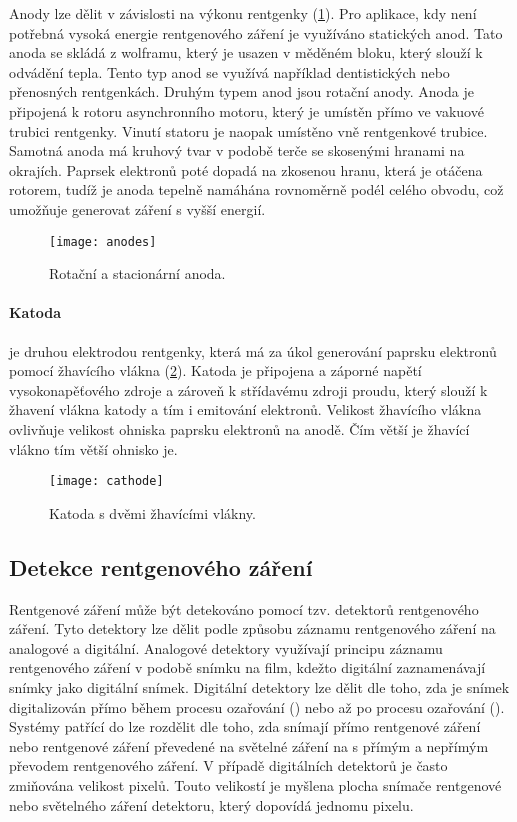 Anody lze dělit v závislosti na výkonu rentgenky (\cref{fig:anodes}). Pro aplikace, kdy není potřebná vysoká energie rentgenového záření je využíváno statických anod. Tato anoda se skládá z wolframu, který je usazen v měděném bloku, který slouží k odvádění tepla. Tento typ anod se využívá například dentistických nebo přenosných rentgenkách. Druhým typem anod jsou rotační anody. Anoda je připojená k rotoru asynchronního motoru, který je umístěn přímo ve vakuové trubici rentgenky. Vinutí statoru je naopak umístěno vně rentgenkové trubice. Samotná anoda má kruhový tvar v podobě terče se skosenými hranami na okrajích. Paprsek elektronů poté dopadá na zkosenou hranu, která je otáčena rotorem, tudíž je anoda tepelně namáhána rovnoměrně podél celého obvodu, což umožňuje generovat záření s vyšší energií. \cite[str.~98]{Diagnostic-Radiology-Physics}

\begin{figure}[hb]
\centering
\texttt{[image: anodes]}
\caption{Rotační a stacionární anoda. \cite{the-xray-beam}}
\label{fig:anodes}
\end{figure}


\paragraph{Katoda}
je druhou elektrodou rentgenky, která má za úkol generování paprsku elektronů pomocí žhavícího vlákna (\cref{fig:cathode}). Katoda je připojena a záporné napětí vysokonapěťového zdroje a zároveň k střídavému zdroji proudu, který slouží k žhavení vlákna katody a tím i emitování elektronů.\cite[str.~93]{Diagnostic-Radiology-Physics} Velikost žhavícího vlákna ovlivňuje velikost ohniska paprsku elektronů na anodě. Čím větší je žhavící vlákno tím větší ohnisko je.

\begin{figure}[hb]
\centering
\texttt{[image: cathode]}
\caption{Katoda s dvěmi žhavícími vlákny. \cite{the-xray-beam}}
\label{fig:cathode}
\end{figure}

\subsection{Detekce rentgenového záření}
Rentgenové záření může být detekováno pomocí tzv. detektorů rentgenového záření. Tyto detektory lze dělit podle způsobu záznamu rentgenového záření na analogové a digitální. Analogové detektory využívají principu záznamu rentgenového záření v podobě snímku na film, kdežto digitální zaznamenávají snímky jako digitální snímek. Digitální detektory lze dělit dle toho, zda je snímek digitalizován přímo během procesu ozařování () nebo až po procesu ozařování (). Systémy patřící do  lze rozdělit dle toho, zda snímají přímo rentgenové záření nebo rentgenové záření převedené na světelné záření na  s přímým a nepřímým převodem rentgenového záření. V případě digitálních detektorů je často zmiňována velikost pixelů. Touto velikostí je myšlena plocha snímače rentgenové nebo světelného záření detektoru, který dopovídá jednomu pixelu.

